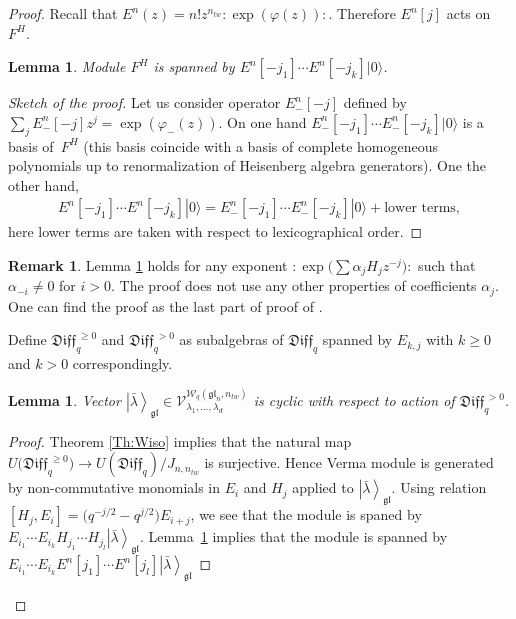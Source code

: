 \documentclass[pdftex]{sigma}
\numberwithin{equation}{section}
\newtheorem{Lemma}[Theorem]{Lemma}
\theoremstyle{definition}
\newtheorem{Remark}[Theorem]{Remark}
\newcommand{\vac}{|0 \rangle}
\newcommand{\qD}{\mathfrak{Diff}_q}
\newcommand{ \twWgl }{ \mathcal{W}_{q} ( \mathfrak{gl}_n, n_{tw} ) }
\newcommand{\Vergl}{\mathcal{V}^{\twWgl}_{\lambda_1, \dots, \lambda_d} }
\newcommand{\vacgl}{\left|\bar{\lambda} \right\rangle_{\mathfrak{gl}} }
\begin{document}
\begin{proof}Recall that $E^n(z) = n! z^{n_{tw}} : \! \exp(\varphi(z)) \! :$. Therefore $E^n[j]$ acts on $F^H$.
\begin{Lemma} \label{lemma: Heis and En}Module $F^H$ is spanned by $E^n[-j_1] \cdots E^n[-j_k] \vac$.
\end{Lemma}
\begin{proof}[Sketch of the proof]
Let us consider operator $E_{-}^n[-j]$ defined by $\sum_j E_{-}^n [-j] z^j = \exp(\varphi_- (z))$. On one hand $E^n_-[-j_1] \cdots E^n_-[-j_k] \vac$ is a basis of~$F^H$ (this basis coincide with a basis of complete homogeneous polynomials up to renormalization of Heisenberg algebra generators). One the other hand,
\begin{gather*}
E^n[-j_1] \cdots E^n[-j_k] \vac = E^n_-[-j_1] \cdots E^n_-[-j_k] \vac + \text{lower terms},
\end{gather*}
here lower terms are taken with respect to lexicographical order.
\end{proof}

\begin{Remark}
Lemma \ref{lemma: Heis and En} holds for any exponent $: \! \exp \big( \sum \alpha_j H_j z^{-j} \big) \! :$ such that $\alpha_{-i} \neq 0$ for $i>0$. The proof does not use any other properties of coefficients $\alpha_j$. One can find the proof as the last part of proof of \cite[Proposition~2.29]{N16}.
\end{Remark}

Define $\qD^{\ \geqslant 0}$ and $\qD^{\ >0}$ as subalgebras of $\qD$ spanned by $E_{k,j}$ with $k \geqslant 0$ and $k>0$ correspondingly.

\begin{Lemma} \label{lemma: q-dif >0 Verma}
Vector $\vacgl \in \Vergl$ is cyclic with respect to action of $\qD^{\, > 0}$.
\end{Lemma}
\begin{proof}
Theorem \ref{Th:Wiso} implies that the natural map $U\big(\qD^{\ \geqslant 0}\big) \rightarrow U(\qD)/J_{n,n_{tw}}$ is surjective. Hence Verma module is generated by non-commutative monomials in $E_i$ and $H_j$ applied to $\vacgl$. Using relation $[H_j, E_i] = \big(q^{-j/2}-q^{j/2}\big) E_{i+j} $, we see that the module is spaned by $E_{i_1} \cdots E_{i_k} H_{j_1} \cdots H_{j_l} \vacgl$. Lemma~\ref{lemma: Heis and En} implies that the module is spanned by $E_{i_1} \cdots E_{i_k} E^n[j_1]\allowbreak \cdots E^n[j_l] \vacgl$
\end{proof}


\end{proof}
\end{document}
